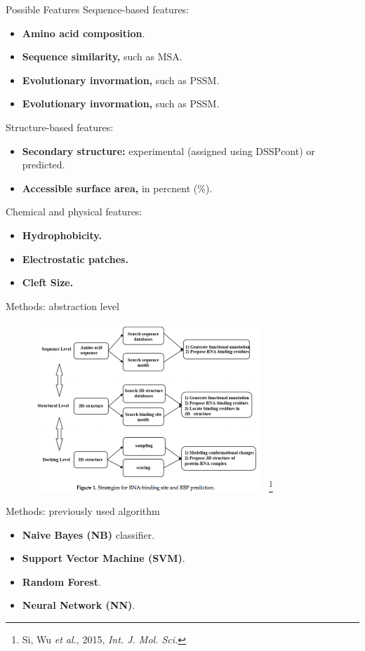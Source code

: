 \documentclass[pdf]
{beamer}
\begin{document}
\begin{frame}{Possible Features}
	Sequence-based features:
	\begin{itemize}
		\item \textbf{Amino acid composition}.
		\item \textbf{Sequence similarity,} such as MSA.
		\item \textbf{Evolutionary invormation,} such as PSSM. 
		\item \textbf{Evolutionary invormation,} such as PSSM. 
	\end{itemize}
	Structure-based features:
	\begin{itemize}
		\item \textbf{Secondary structure:} experimental (assigned using DSSPcont) or predicted.
		\item \textbf{Accessible surface area,} in percnent (\%).
	\end{itemize}
	Chemical and physical features:
	\begin{itemize}
		\item \textbf{Hydrophobicity.}
		\item \textbf{Electrostatic patches.}
		\item \textbf{Cleft Size.}
	\end{itemize}
\end{frame}

\begin{frame}{Methods: abstraction level}
	\begin{figure}[ht]
		\begin{center}
			\includegraphics[height=2.5in]{ss_1.png}
			~\footnote{Si, Wu \textit{et al.}, 2015, \textit{Int. J. Mol. Sci.}}
		\end{center}
	\end{figure}
\end{frame}

\begin{frame}{Methods: previously used algorithm}
	\begin{itemize}
		\item \textbf{Naive Bayes (NB)} classifier.
		\item \textbf{Support Vector Machine (SVM)}.
		\item \textbf{Random Forest}.
		\item \textbf{Neural Network (NN)}.
	\end{itemize}
\end{frame}
\end{document}
